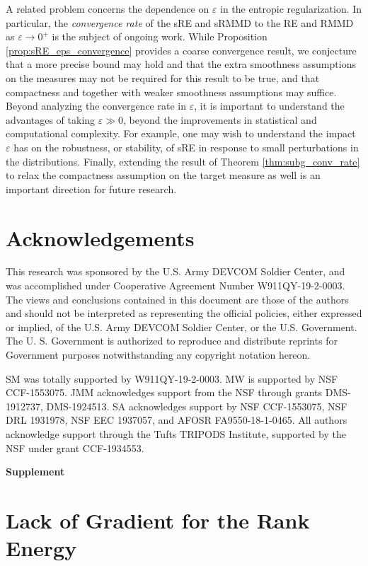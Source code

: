 \documentclass{article}
\theoremstyle{definition}
\begin{document}
A related problem concerns the dependence on $\varepsilon$ in the entropic regularization.  In particular, the \textit{convergence rate} of the sRE and sRMMD to the RE and RMMD as $\varepsilon\rightarrow 0^{+}$ is the subject of ongoing work.  While Proposition \ref{prop:sRE_eps_convergence} provides a coarse convergence result, we conjecture that a more precise bound may hold and that the extra smoothness assumptions on the measures may not be required for this result to be true, and that compactness and together with weaker smoothness assumptions may suffice.  Beyond analyzing the convergence rate in $\varepsilon$, it is important to understand the advantages of taking $\varepsilon\gg 0$, beyond the improvements in statistical and computational complexity. For example, one may wish to understand the impact $\varepsilon$ has on the robustness, or stability, of sRE in response to small perturbations in the distributions. Finally, extending the result of Theorem \ref{thm:subg_conv_rate} to relax the compactness assumption on the target measure as well is an important direction for future research.

\section*{Acknowledgements}
This research was sponsored by the U.S. Army DEVCOM Soldier Center, and was accomplished under Cooperative Agreement Number W911QY-19-2-0003. The views and conclusions contained in this document are those of the authors and should not be interpreted as representing the official policies, either expressed or implied, of the U.S. Army DEVCOM Soldier Center, or the U.S. Government. The U. S. Government is authorized to reproduce and distribute reprints for Government purposes notwithstanding any copyright notation hereon.


SM was totally supported by W911QY-19-2-0003. MW is supported by NSF CCF-1553075. JMM acknowledges support from the NSF through grants DMS-1912737, DMS-1924513. SA acknowledges support by NSF CCF-1553075, NSF DRL 1931978, NSF EEC 1937057, and AFOSR FA9550-18-1-0465. All authors acknowledge  support through the Tufts TRIPODS Institute, supported by the NSF under grant CCF-1934553.


\newpage



\newpage


\centerline{\huge{\textbf{Supplement}}}

\section{Lack of Gradient for the Rank Energy} \label{sec:lack_of_grad}
\end{document}
